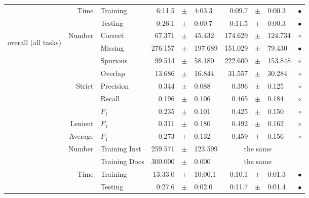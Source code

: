 \begin{longtable}{|r|r|l||rcl|rcl|c|}
\cline{2-10} & \multirow{2}{*}{      Time} &        Training &      6:11.5 &  $\pm$  &      4:03.3 &      0:09.7 &  $\pm$  &      0:00.3 & $\bullet$ \\
\cline{3-10} &                             &         Testing &      0:26.1 &  $\pm$  &      0:00.7 &      0:11.5 &  $\pm$  &      0:00.3 & $\bullet$ \\
\hline
\hline
\multirow{11}{*}{\begin{sideways}overall (all tasks)\end{sideways} }
             & \multirow{4}{*}{    Number} &         Correct &      67.371 &  $\pm$  &      45.432 &     174.629 &  $\pm$  &     124.734 & $\circ$ \\
\cline{3-10} &                             &         Missing &     276.157 &  $\pm$  &     197.689 &     151.029 &  $\pm$  &      79.430 & $\bullet$ \\
\cline{3-10} &                             &        Spurious &      99.514 &  $\pm$  &      58.180 &     222.600 &  $\pm$  &     153.848 & $\circ$ \\
\cline{3-10} &                             &         Overlap &      13.686 &  $\pm$  &      16.844 &      31.557 &  $\pm$  &      30.284 & $\circ$ \\
\cline{2-10} & \multirow{3}{*}{    Strict} &       Precision &       0.344 &  $\pm$  &       0.088 &       0.396 &  $\pm$  &       0.125 & $\circ$ \\
\cline{3-10} &                             &          Recall &       0.196 &  $\pm$  &       0.106 &       0.465 &  $\pm$  &       0.184 & $\circ$ \\
\cline{3-10} &                             &           $F_1$ &       0.235 &  $\pm$  &       0.101 &       0.425 &  $\pm$  &       0.150 & $\circ$ \\
\cline{2-10} &                     Lenient &           $F_1$ &       0.311 &  $\pm$  &       0.180 &       0.492 &  $\pm$  &       0.162 & $\circ$ \\
\cline{2-10} &                     Average &           $F_1$ &       0.273 &  $\pm$  &       0.132 &       0.459 &  $\pm$  &       0.156 & $\circ$ \\
\cline{2-10} & \multirow{2}{*}{    Number} &   Training Inst &     259.571 &  $\pm$  &     123.599 &    \multicolumn{3}{c|}{the same}         &  \\
\cline{3-10} &                             &   Training Docs &     300.000 &  $\pm$  &       0.000 &    \multicolumn{3}{c|}{the same}         &  \\
\cline{2-10} & \multirow{2}{*}{      Time} &        Training &     13:33.0 &  $\pm$  &     10:00.1 &      0:10.1 &  $\pm$  &      0:01.3 & $\bullet$ \\
\cline{3-10} &                             &         Testing &      0:27.6 &  $\pm$  &      0:02.0 &      0:11.7 &  $\pm$  &      0:01.4 & $\bullet$ \\
\hline
\end{longtable}

